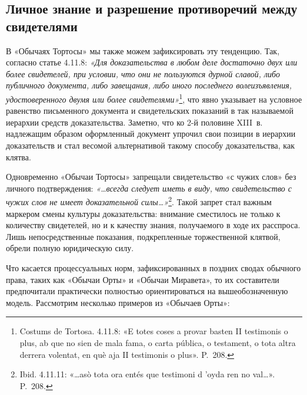 \subsection{Личное знание и разрешение противоречий между свидетелями}

В «Обычаях Тортосы» мы также можем зафиксировать эту тенденцию. Так, согласно статье 4.11.8: \emph{«Для доказательства в любом деле достаточно двух или более свидетелей, при условии, что они не пользуются дурной славой, либо публичного документа, либо завещания, либо иного последнего волеизъявления, удостоверенного двумя или более свидетелями»}\footnote{Costums de Tortosa. 4.11.8: «E totes coses a provar basten II testimonis o plus, ab que no sien de mala fama, o carta pública, o testament, o tota altra derrera volentat, en què aja II testimonis o plus». P.~208.}, что явно указывает на условное равенство письменного документа и свидетельских показаний в так называемой иерархии средств доказательства. Заметно, что ко 2-й половине XIII~в. надлежащим образом оформленный документ упрочил свои позиции в иерархии доказательств и стал весомой альтернативой такому способу доказательства, как клятва.

Одновременно «Обычаи Тортосы» запрещали свидетельство «с чужих слов» без личного подтверждения: \emph{«…всегда следует иметь в виду, }\emph{что свидетельство с чужих слов не имеет доказательной силы…»}\footnote{Ibid. 4.11.11: «…asò tota ora entés que testimoni d 'oyda ren no val…». P.~208.}. Такой запрет стал важным маркером смены культуры доказательства: внимание сместилось не только к количеству свидетелей, но и к качеству знания, получаемого в ходе их расспроса. Лишь непосредственные показания, подкрепленные торжественной клятвой, обрели полную юридическую силу.

Что касается процессуальных норм, зафиксированных в поздних сводах обычного права, таких как «Обычаи Орты» и «Обычаи Миравета», то их составители предпочитали практически полностью ориентироваться на вышеобозначенную модель. Рассмотрим несколько примеров из «Обычаев Орты»:


